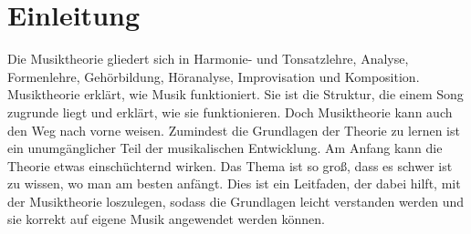 \section{Einleitung}
Die Musiktheorie gliedert sich in Harmonie- und Tonsatzlehre, Analyse, 
Formenlehre, Gehörbildung, Höranalyse, Improvisation und Komposition.
Musiktheorie erklärt, wie Musik funktioniert. Sie ist die Struktur, die einem Song zugrunde liegt und erklärt, wie sie funktionieren. Doch Musiktheorie kann 
auch den Weg nach vorne weisen. Zumindest die Grundlagen der Theorie zu lernen ist ein 
unumgänglicher Teil der musikalischen Entwicklung. Am Anfang kann die Theorie etwas 
einschüchternd wirken. Das Thema ist so groß, dass es schwer ist zu wissen, wo man am 
besten anfängt. Dies ist ein Leitfaden, der dabei hilft, mit der Musiktheorie 
loszulegen, sodass die Grundlagen leicht verstanden werden und sie korrekt auf eigene 
Musik angewendet werden können.

 
